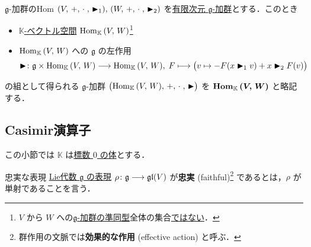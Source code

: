 \documentclass[rep_main]{subfiles}
\begin{document}
\begin{mydef}[label=def:gmod-hom]{$\mathfrak{g}$-加群のHom}
	$(V,\, +,\, \cdot\;,\, \blacktriangleright_1) ,\, (W,\, +,\, \cdot\;,\, \blacktriangleright_2)$ を\underline{有限次元}\hyperref[ax:g-module]{ $\mathfrak{g}$-加群}とする．このとき
	\begin{itemize}
		\item \hyperref[def:vec-hom]{$\mathbb{K}$-ベクトル空間} $\mathrm{Hom}_{\mathbb{K}} \mathop{}(V,\, W)$\footnote{$V$ から $W$ への\hyperref[def:g-module-hom]{$\mathfrak{g}$-加群の準同型}全体の集合\underline{ではない}．}
		\item $\mathrm{Hom}_{\mathbb{K}} \mathop{}(V,\, W)$ への $\mathfrak{g}$ の左作用
		\begin{align}
			\blacktriangleright \colon \mathfrak{g} \times \mathrm{Hom}_{\mathbb{K}} \mathop{}(V,\, W) \longrightarrow \mathrm{Hom}_{\mathbb{K}} \mathop{}(V,\, W),\; F \longmapsto \bigl( v \mapsto - F(x \blacktriangleright_1 v) + x \blacktriangleright_2 F(v) \bigr) 
		\end{align}
	\end{itemize}
	の組として得られる $\mathfrak{g}$-加群 $\bigl(\mathrm{Hom}_{\mathbb{K}} \mathop{}(V,\, W),\, +,\, \cdot\;,\, \blacktriangleright\bigr)$ を $\bm{\mathrm{Hom}_{\mathbb{K}} \mathop{}(V,\, W)}$ と略記する．
\end{mydef}


\subsection{Casimir演算子}

この小節では $\mathbb{K}$ は\underline{標数 $0$ の体}とする．

\begin{mydef}[label=def:faithful]{忠実な表現}
	\hyperref[def:rep-LieAlg]{Lie代数 $\mathfrak{g}$ の表現} $\rho \colon \mathfrak{g} \longrightarrow \mathfrak{gl} (V)$ が\textbf{忠実} (faithful)\footnote{群作用の文脈では\textbf{効果的な作用} (effective action) と呼ぶ．} であるとは，$\rho$ が単射であることを言う．
\end{mydef}
\end{document}
